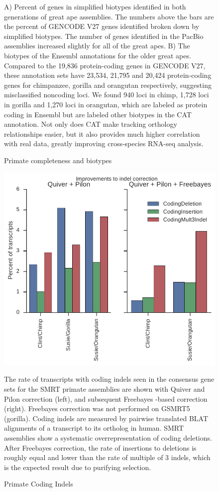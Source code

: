 \documentclass[fleqn,10pt]{wlscirep}
\begin{document}
\begin{figure}
\caption{Primate completeness and biotypes}
A) Percent of genes in simplified biotypes identified in both generations of great ape assemblies. The numbers above the bars are the percent of GENCODE V27 genes identified broken down by simplified biotypes. The number of genes identified in the PacBio assemblies increased slightly for all of the great apes. B) The biotypes of the Ensembl annotations for the older great apes. Compared to the 19,836 protein-coding genes in GENCODE V27, these annotation sets have 23,534, 21,795 and 20,424 protein-coding genes for chimpanzee, gorilla and orangutan respectively, suggesting misclassified noncoding loci. We found 940 loci in chimp, 1,728 loci in gorilla and 1,270 loci in orangutan, which are labeled as protein coding in Ensembl but are labeled other biotypes in the CAT annotation. Not only does CAT make tracking orthology relationships easier, but it also provides much higher correlation with real data, greatly improving cross-species RNA-seq analysis.
\label{supp_fig:primate_completeness}
\end{figure}

\begin{figure}
\centering
\includegraphics[width=\textwidth,height=\textheight,keepaspectratio]{primate_indels.pdf}
\caption{Primate Coding Indels}
The rate of transcripts with coding indels seen in the consensus gene sets for the SMRT primate assemblies are shown with Quiver and Pilon correction (left), and subsequent Freebayes \cite{garrison2012haplotype}-based correction (right). Freebayes correction was not performed on GSMRT5 (gorilla). Coding indels are measured by pairwise translated BLAT alignments of a transcript to its ortholog in human. SMRT assemblies show a systematic overrepresentation of coding deletions. After Freebayes correction, the rate of insertions to deletions is roughly equal and lower than the rate of multiple of 3 indels, which is the expected result due to purifying selection.
\label{supp_fig:primate_indels}
\end{figure}
\end{document}
